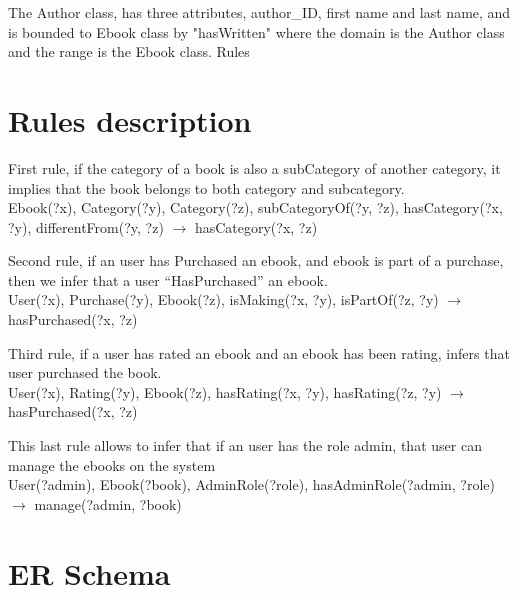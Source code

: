 \documentclass[a4paper,11pt]{article}
\begin{document}
The Author class, has three attributes, author\_ID, first name and last name, and is bounded to Ebook class by "hasWritten" where the domain is the Author class and the range is the Ebook class. 
Rules

\section{Rules description}
First rule, if the category of a book is also a subCategory of another category, it implies that the book belongs to both category and subcategory.\\
Ebook(?x), Category(?y), Category(?z), subCategoryOf(?y, ?z), hasCategory(?x, ?y), differentFrom(?y, ?z) $\rightarrow$ hasCategory(?x, ?z)

Second rule, if an user has Purchased an ebook, and ebook is part of a purchase, then we infer that a user “HasPurchased” an ebook. \\
User(?x), Purchase(?y), Ebook(?z), isMaking(?x, ?y), isPartOf(?z, ?y) $\rightarrow$ hasPurchased(?x, ?z)

Third rule, if a user has rated an ebook and an ebook has been rating, infers that user purchased the book.\\
User(?x), Rating(?y), Ebook(?z), hasRating(?x, ?y), hasRating(?z, ?y) $\rightarrow$ hasPurchased(?x, ?z)

This last rule allows to infer that if an user has the role admin, that user can manage the ebooks on the system\\
User(?admin), Ebook(?book), AdminRole(?role), hasAdminRole(?admin, ?role) $\rightarrow$ manage(?admin, ?book)

\section{ER Schema}

\begin{center}
\end{center}
\end{document}

